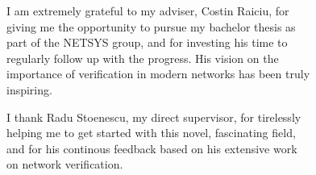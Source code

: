 \vspace*{7cm}
\begin{center}
I am extremely grateful to my adviser, Costin Raiciu, for\\
giving me the opportunity to pursue my bachelor thesis as\\
part of the NETSYS group, and for investing his time to\\
regularly follow up with the progress.  His vision on the\\
importance of verification in modern networks has been truly\\
inspiring.\\
\end{center}
\vspace{0.6cm}
\begin{center}
I thank Radu Stoenescu, my direct supervisor, for tirelessly\\
helping me to get started with this novel, fascinating field,\\
and for his continous feedback based on his extensive work\\
on network verification.
\end{center}
